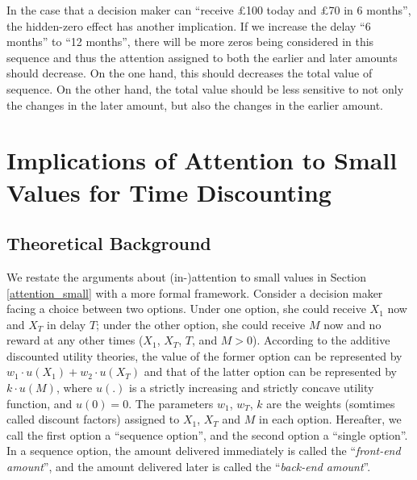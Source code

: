 \documentclass[
  12pt,
]{article}
\begin{document}
In the case that a decision maker can ``receive £100 today and £70 in 6
months'', the hidden-zero effect has another implication. If we increase
the delay ``6 months'' to ``12 months'', there will be more zeros being
considered in this sequence and thus the attention assigned to both the
earlier and later amounts should decrease. On the one hand, this should
decreases the total value of sequence. On the other hand, the total
value should be less sensitive to not only the changes in the later
amount, but also the changes in the earlier amount.

\hypertarget{implications-of-attention-to-small-values-for-time-discounting}{%
\section{Implications of Attention to Small Values for Time
Discounting}\label{implications-of-attention-to-small-values-for-time-discounting}}

\hypertarget{theoretical-background}{%
\subsection{Theoretical Background}\label{theoretical-background}}

We restate the arguments about (in-)attention to small values in Section
\ref{attention_small} with a more formal framework. Consider a decision
maker facing a choice between two options. Under one option, she could
receive \(X_1\) now and \(X_T\) in delay \(T\); under the other option,
she could receive \(M\) now and no reward at any other times (\(X_1\),
\(X_T\), \(T\), and \(M>0\)). According to the additive discounted
utility theories, the value of the former option can be represented by
\(w_1\cdot u(X_1) +w_2\cdot u(X_T)\) and that of the latter option can
be represented by \(k\cdot u(M)\), where \(u(.)\) is a strictly
increasing and strictly concave utility function, and \(u(0)=0\). The
parameters \(w_1\), \(w_T\), \(k\) are the weights (somtimes called
discount factors) assigned to \(X_1\), \(X_T\) and \(M\) in each option.
Hereafter, we call the first option a ``sequence option'', and the
second option a ``single option''. In a sequence option, the amount
delivered immediately is called the ``\emph{front-end amount}'', and the
amount delivered later is called the ``\emph{back-end amount}''.
\end{document}

